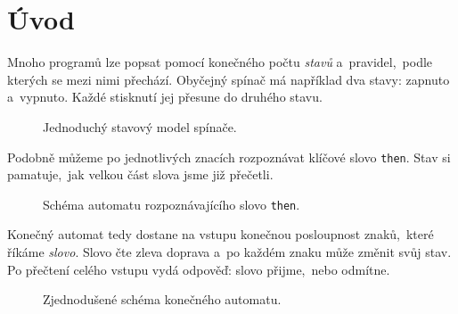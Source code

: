 \section{Úvod}\label{sec:uvod}

Mnoho programů lze popsat pomocí konečného počtu \emph{stavů} a~pravidel,~podle kterých se mezi nimi přechází. Obyčejný spínač má například dva stavy: zapnuto a~vypnuto. Každé stisknutí jej přesune do druhého stavu.
\begin{figure}[h]
    \centering
    
    \caption{Jednoduchý stavový model spínače.}
    \label{fig:vypinac}
\end{figure}

Podobně můžeme po jednotlivých znacích rozpoznávat klíčové slovo \texttt{then}. Stav si pamatuje,~jak velkou část slova jsme již přečetli.
\begin{figure}[h]
    \centering
    
    \caption{Schéma automatu rozpoznávajícího slovo \texttt{then}.}
    \label{fig:automat-then}
\end{figure}

Konečný automat tedy dostane na vstupu konečnou posloupnost znaků,~které říkáme \emph{slovo}. Slovo čte zleva doprava a~po každém znaku může změnit svůj stav. Po přečtení celého vstupu vydá odpověď: slovo přijme,~nebo odmítne.
\begin{figure}[h]
    \centering
    
    \caption{Zjednodušené schéma konečného automatu.}
    \label{fig:konecny-automat}
\end{figure}

